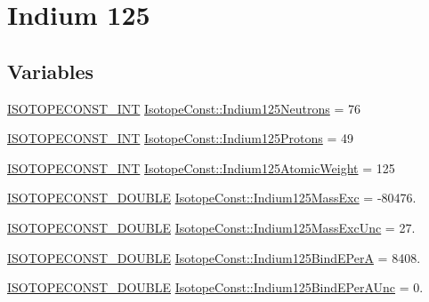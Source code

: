 \hypertarget{group___isotope_const-_indium-_in125}{}\section{Indium 125}
\label{group___isotope_const-_indium-_in125}
\subsection*{Variables}
\begin{DoxyCompactItemize}
\item 
\mbox{\hyperlink{group___isotope_const-_macros_ga5f18360b3e99483a35c32d789e62621c}{I\+S\+O\+T\+O\+P\+E\+C\+O\+N\+S\+T\+\_\+\+I\+NT}} \mbox{\hyperlink{group___isotope_const-_indium-_in125_gaab6fa32c7adbd4aea99a7872dc80e9b4}{Isotope\+Const\+::\+Indium125\+Neutrons}} = 76
\item 
\mbox{\hyperlink{group___isotope_const-_macros_ga5f18360b3e99483a35c32d789e62621c}{I\+S\+O\+T\+O\+P\+E\+C\+O\+N\+S\+T\+\_\+\+I\+NT}} \mbox{\hyperlink{group___isotope_const-_indium-_in125_gaaea9b035504cc085ca4f097700e0f44c}{Isotope\+Const\+::\+Indium125\+Protons}} = 49
\item 
\mbox{\hyperlink{group___isotope_const-_macros_ga5f18360b3e99483a35c32d789e62621c}{I\+S\+O\+T\+O\+P\+E\+C\+O\+N\+S\+T\+\_\+\+I\+NT}} \mbox{\hyperlink{group___isotope_const-_indium-_in125_gae3a799edd88350b2da04250bff1402ae}{Isotope\+Const\+::\+Indium125\+Atomic\+Weight}} = 125
\item 
\mbox{\hyperlink{group___isotope_const-_macros_ga8f45a7272ce02c0b4c65c44636ed719a}{I\+S\+O\+T\+O\+P\+E\+C\+O\+N\+S\+T\+\_\+\+D\+O\+U\+B\+LE}} \mbox{\hyperlink{group___isotope_const-_indium-_in125_ga8cb6bc51454059cbf661cd6c1fd384ec}{Isotope\+Const\+::\+Indium125\+Mass\+Exc}} = -\/80476.
\item 
\mbox{\hyperlink{group___isotope_const-_macros_ga8f45a7272ce02c0b4c65c44636ed719a}{I\+S\+O\+T\+O\+P\+E\+C\+O\+N\+S\+T\+\_\+\+D\+O\+U\+B\+LE}} \mbox{\hyperlink{group___isotope_const-_indium-_in125_ga70f231e4156873aa339d71f85ab61d72}{Isotope\+Const\+::\+Indium125\+Mass\+Exc\+Unc}} = 27.
\item 
\mbox{\hyperlink{group___isotope_const-_macros_ga8f45a7272ce02c0b4c65c44636ed719a}{I\+S\+O\+T\+O\+P\+E\+C\+O\+N\+S\+T\+\_\+\+D\+O\+U\+B\+LE}} \mbox{\hyperlink{group___isotope_const-_indium-_in125_gaf92db647cfdfb0a3a70eb2cdbc09b06f}{Isotope\+Const\+::\+Indium125\+Bind\+E\+PerA}} = 8408.
\item 
\mbox{\hyperlink{group___isotope_const-_macros_ga8f45a7272ce02c0b4c65c44636ed719a}{I\+S\+O\+T\+O\+P\+E\+C\+O\+N\+S\+T\+\_\+\+D\+O\+U\+B\+LE}} \mbox{\hyperlink{group___isotope_const-_indium-_in125_gafead977dab72719d74528685e1459921}{Isotope\+Const\+::\+Indium125\+Bind\+E\+Per\+A\+Unc}} = 0.

\end{DoxyCompactItemize}
